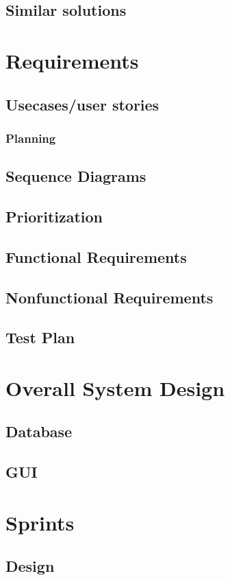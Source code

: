 \documentclass[10pt,a4paper,oneside]{report}
\begin{document}
\section{Similar solutions}


\chapter{Requirements}
\section{Usecases/user stories}
\subsection{Planning}
\section{Sequence Diagrams}
\section{Prioritization}
\section{Functional Requirements}
\section{Nonfunctional Requirements}
\section{Test Plan}

\chapter{Overall System Design}
\section{Database}
\section{GUI}

\chapter{Sprints}
\section{Design}
\end{document}
